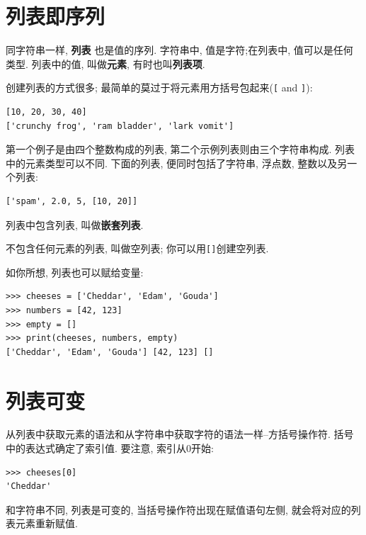 \documentclass[10pt]{book}
\begin{document}
\section{列表即序列}
\label{sequence}

同字符串一样, {\bf 列表} 也是值的序列. 
字符串中, 值是字符;在列表中, 值可以是任何类型. 
列表中的值, 叫做{\bf 元素}, 有时也叫{\bf 列表项}.

创建列表的方式很多; 最简单的莫过于将元素用方括号包起来(\verb"[" and \verb"]"):

\begin{verbatim}
[10, 20, 30, 40]
['crunchy frog', 'ram bladder', 'lark vomit']
\end{verbatim}
%
第一个例子是由四个整数构成的列表, 
第二个示例列表则由三个字符串构成. 
列表中的元素类型可以不同. 
下面的列表, 便同时包括了字符串, 浮点数, 整数以及另一个列表:

\begin{verbatim}
['spam', 2.0, 5, [10, 20]]
\end{verbatim}
%
列表中包含列表, 叫做{\bf 嵌套列表}.

不包含任何元素的列表, 叫做空列表;
你可以用\verb"[]"创建空列表.

如你所想, 列表也可以赋给变量:

\begin{verbatim}
>>> cheeses = ['Cheddar', 'Edam', 'Gouda']
>>> numbers = [42, 123]
>>> empty = []
>>> print(cheeses, numbers, empty)
['Cheddar', 'Edam', 'Gouda'] [42, 123] []
\end{verbatim}
%


\section{列表可变}
\label{mutable}

从列表中获取元素的语法和从字符串中获取字符的语法一样--方括号操作符. 
括号中的表达式确定了索引值. 
要注意, 索引从0开始:

\begin{verbatim}
>>> cheeses[0]
'Cheddar'
\end{verbatim}
%
和字符串不同, 列表是可变的, 当括号操作符出现在赋值语句左侧, 
就会将对应的列表元素重新赋值. 
\end{document}
